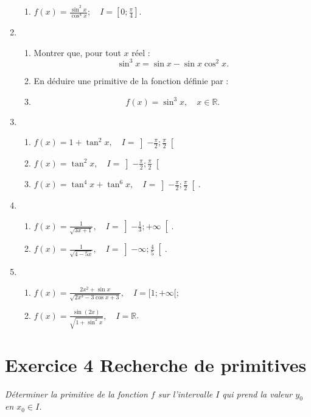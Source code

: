 \documentclass[12pt]{article}
\begin{document}
\begin{enumerate}
\begin{enumerate}
			\item \( f(x) = \frac{\sin^2 x}{\cos^4 x}; \quad I = \left[ 0; \frac{\pi}{4} \right] \).
		\end{enumerate}
		\item
		\begin{enumerate}
			\item Montrer que, pour tout \( x \) réel :
			\[\sin^3 x = \sin x - \sin x \cos^2 x.\]
			\item En déduire une primitive de la fonction définie par :
			\item \[f(x) = \sin^3 x, \quad x \in \mathbb{R}.\]
		\end{enumerate}
		\item
	\begin{enumerate}
		\item \( f(x) = 1 + \tan^2 x, \quad I = \left] - \frac{\pi}{2}; \frac{\pi}{2} \right[ \)
  	\item \( f(x) = \tan^2 x, \quad I = \left] - \frac{\pi}{2}; \frac{\pi}{2} \right[ \)
		\item \( f(x) = \tan^4 x + \tan^6 x, \quad I = \left] - \frac{\pi}{2}; \frac{\pi}{2} \right[ \).
	\end{enumerate}
	\item
	\begin{enumerate}
	\item \( f(x) = \frac{1}{\sqrt{3x + 1}}, \quad I = \left] -\frac{1}{3}; +\infty \right[ \).
	\item \( f(x) = \frac{1}{\sqrt{4 - 5x}}, \quad I = \left] -\infty; \frac{4}{5} \right[ \).
	\end{enumerate}
	\item
	\begin{enumerate}
	\item \( f(x) = \frac{2x^2 + \sin x}{\sqrt{2x^3 - 3 \cos x + 3}}, \quad I = [1; +\infty[ \);\\
	\item \( f(x) = \frac{\sin(2x)}{\sqrt{1 + \sin^2 x}}, \quad I = \mathbb{R} \).
	\end{enumerate}
\end{enumerate}

\section*{Exercice 4 \quad Recherche de primitives}

\emph{Déterminer la primitive de la fonction $f$ sur l'intervalle $I$ qui prend la valeur $y_0$ en $x_0 \in I$.}
\end{document}
